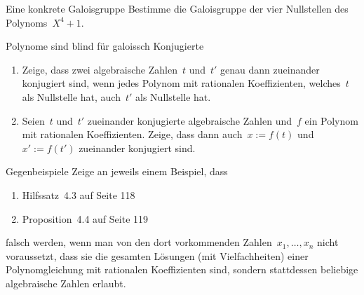 \documentclass{algblatt}
\begin{document}
\begin{aufgabe}{Eine konkrete Galoisgruppe}
Bestimme die Galoisgruppe der vier Nullstellen des Polynoms~$X^4 + 1$.
\end{aufgabe}

\begin{aufgabe}{Polynome sind blind für galoissch Konjugierte}
\begin{enumerate}
\item Zeige, dass zwei algebraische Zahlen~$t$ und~$t'$ genau dann zueinander
konjugiert sind,
wenn jedes Polynom mit
rationalen Koeffizienten, welches~$t$ als Nullstelle hat, auch~$t'$ als
Nullstelle hat.
\item Seien~$t$ und~$t'$ zueinander konjugierte algebraische Zahlen
und~$f$ ein Polynom mit rationalen Koeffizienten. Zeige, dass dann auch~$x := f(t)$ und~$x' := f(t')$ zueinander konjugiert sind.
\end{enumerate}
\end{aufgabe}

\begin{aufgabe}{Gegenbeispiele}
Zeige an jeweils einem Beispiel, dass
\vspace{-0.5em}
\begin{multicols}{2}
\begin{enumerate}
\item Hilfssatz~4.3 auf Seite 118
\item Proposition~4.4 auf Seite 119
\end{enumerate}
\end{multicols}
\vspace{-1em}
falsch werden, wenn man von den dort vorkommenden Zahlen~$x_1,\ldots,x_n$ nicht
voraussetzt, dass sie die gesamten Lösungen (mit Vielfachheiten) einer Polynomgleichung
mit rationalen Koeffizienten sind, sondern stattdessen beliebige algebraische
Zahlen erlaubt.
\end{aufgabe}
\end{document}
